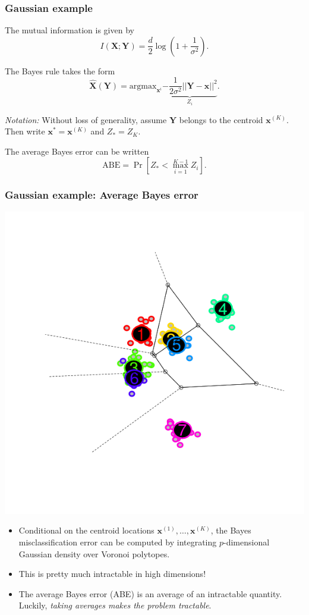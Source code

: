 \documentclass{beamer}
\newcommand{\argmax}{\text{argmax}}
\newcommand{\bx}{\boldsymbol{x}}
\newcommand{\bX}{\boldsymbol{X}}
\newcommand{\bY}{\boldsymbol{Y}}
\begin{document}
\begin{frame}
\frametitle{Gaussian example}
The mutual information is given by
\[
I(\bX;\bY) = \frac{d}{2}\log(1 + \frac{1}{\sigma^2}).
\]

The Bayes rule takes the form
\[
\hat{\bX}(\bY) = \argmax_{\bx^{i}} \underbrace{-\frac{1}{2\sigma^2} ||\bY - \bx||^2}_{Z_i}.
\]

\emph{Notation:}
Without loss of generality, assume $\bY$ belongs to the centroid $\bx^{(K)}$.
Then write $\bx^* = \bx^{(K)}$ and $Z_* = Z_K$.

The average Bayes error can be written
\[
\text{ABE} = \Pr[Z_* < \max_{i=1}^{K-1} Z_i].
\]
\end{frame}

\begin{frame}
\frametitle{Gaussian example: Average Bayes error}

\begin{center}
\includegraphics[scale = 0.3, clip = true, trim = 0.6in 3in 0.6in 1.5in]{../info_theory_paper/gaussian_figure1a.png}
\end{center}

\begin{itemize}
\item Conditional on the centroid locations $\bx^{(1)},\hdots,
  \bx^{(K)}$, the Bayes misclassification error can be computed by
  integrating $p$-dimensional Gaussian density over Voronoi polytopes.
\item This is pretty much intractable in high dimensions!
\item The average Bayes error (ABE) is an average of
  an intractable quantity.  Luckily, \emph{taking averages makes
    the problem tractable}.
\end{itemize}
\end{frame}
\end{document}
